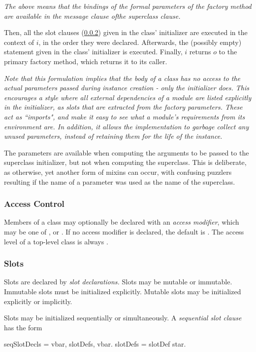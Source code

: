 \documentclass{article}
\begin{document}
{\it
The above means that the bindings of the formal parameters of the factory method are available in the message clause ofthe superclass clause.
}

Then, all the slot clauses (\ref{slots}) given in the class' initializer are executed in the context of $i$, in the order they were declared. Afterwards, the (possibly empty) statement given in the class' initializer is executed.
Finally, $i$ returns $o$ to the primary factory method, which returns it to its caller.
 
{\it Note that this formulation implies that the body of a class has no access to the actual parameters passed during instance creation - only the initializer does. This encourages a style where all external dependencies of a module are listed explicitly in the initializer, as slots that are extracted from the factory parameters. These act as ``imports", and make it easy to see what a module's requirements from its environment are. In addition, it allows the implementation to garbage collect any unused parameters, instead of retaining them for the life of the instance.

The parameters are available when computing the arguments to be passed to the superclass initializer, but not when computing the superclass. This is deliberate, as otherwise, yet another form of mixins can occur,
 with confusing puzzlers resulting if the name of a parameter was used as the name
 of the superclass.}

 

\subsubsection{Access Control}

Members of a class may optionally be declared with an {\em access modifier}, which may be one of \PUBLIC, \PROTECTED{} or \PRIVATE.  If no access modifier is declared, the default is \PROTECTED{}. The access level of a top-level class is always \PUBLIC{}.


\subsubsection{Slots}
\label{slots}

Slots are declared by {\em slot declarations.} 
Slots may be mutable or immutable. Immutable slots must be initialized explicitly. Mutable slots may be initialized explicitly or implicitly. 

Slots may be initialized sequentially or simultaneously. A {\em sequential slot clause} has the form 
\begin{newspeak}
seqSlotDecls = vbar, slotDefs, vbar.
slotDefs = slotDef star.
\end{newspeak}
\end{document}
